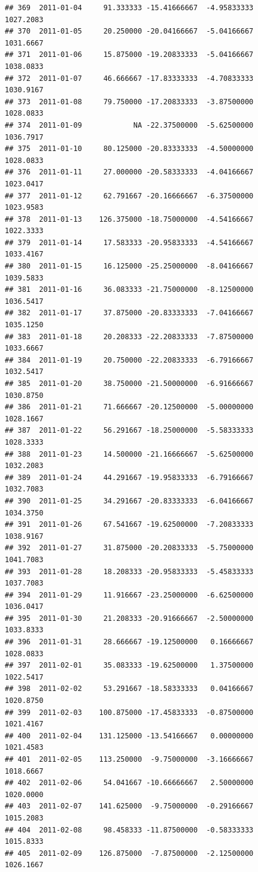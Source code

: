 \documentclass[
]{article}
\begin{document}
\begin{verbatim}
## 369  2011-01-04     91.333333 -15.41666667  -4.95833333    1027.2083
## 370  2011-01-05     20.250000 -20.04166667  -5.04166667    1031.6667
## 371  2011-01-06     15.875000 -19.20833333  -5.04166667    1038.0833
## 372  2011-01-07     46.666667 -17.83333333  -4.70833333    1030.9167
## 373  2011-01-08     79.750000 -17.20833333  -3.87500000    1028.0833
## 374  2011-01-09            NA -22.37500000  -5.62500000    1036.7917
## 375  2011-01-10     80.125000 -20.83333333  -4.50000000    1028.0833
## 376  2011-01-11     27.000000 -20.58333333  -4.04166667    1023.0417
## 377  2011-01-12     62.791667 -20.16666667  -6.37500000    1023.9583
## 378  2011-01-13    126.375000 -18.75000000  -4.54166667    1022.3333
## 379  2011-01-14     17.583333 -20.95833333  -4.54166667    1033.4167
## 380  2011-01-15     16.125000 -25.25000000  -8.04166667    1039.5833
## 381  2011-01-16     36.083333 -21.75000000  -8.12500000    1036.5417
## 382  2011-01-17     37.875000 -20.83333333  -7.04166667    1035.1250
## 383  2011-01-18     20.208333 -22.20833333  -7.87500000    1033.6667
## 384  2011-01-19     20.750000 -22.20833333  -6.79166667    1032.5417
## 385  2011-01-20     38.750000 -21.50000000  -6.91666667    1030.8750
## 386  2011-01-21     71.666667 -20.12500000  -5.00000000    1028.1667
## 387  2011-01-22     56.291667 -18.25000000  -5.58333333    1028.3333
## 388  2011-01-23     14.500000 -21.16666667  -5.62500000    1032.2083
## 389  2011-01-24     44.291667 -19.95833333  -6.79166667    1032.7083
## 390  2011-01-25     34.291667 -20.83333333  -6.04166667    1034.3750
## 391  2011-01-26     67.541667 -19.62500000  -7.20833333    1038.9167
## 392  2011-01-27     31.875000 -20.20833333  -5.75000000    1041.7083
## 393  2011-01-28     18.208333 -20.95833333  -5.45833333    1037.7083
## 394  2011-01-29     11.916667 -23.25000000  -6.62500000    1036.0417
## 395  2011-01-30     21.208333 -20.91666667  -2.50000000    1033.8333
## 396  2011-01-31     28.666667 -19.12500000   0.16666667    1028.0833
## 397  2011-02-01     35.083333 -19.62500000   1.37500000    1022.5417
## 398  2011-02-02     53.291667 -18.58333333   0.04166667    1020.8750
## 399  2011-02-03    100.875000 -17.45833333  -0.87500000    1021.4167
## 400  2011-02-04    131.125000 -13.54166667   0.00000000    1021.4583
## 401  2011-02-05    113.250000  -9.75000000  -3.16666667    1018.6667
## 402  2011-02-06     54.041667 -10.66666667   2.50000000    1020.0000
## 403  2011-02-07    141.625000  -9.75000000  -0.29166667    1015.2083
## 404  2011-02-08     98.458333 -11.87500000  -0.58333333    1015.8333
## 405  2011-02-09    126.875000  -7.87500000  -2.12500000    1026.1667

\end{verbatim}
\end{document}
